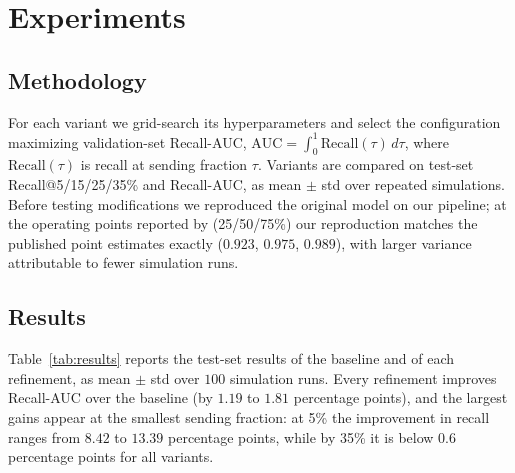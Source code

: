 

\section{Experiments}
\label{sec:experiments}

\subsection{Methodology}
\label{sec:methodology}

For each variant we grid-search its hyperparameters and select the
configuration maximizing validation-set Recall-AUC,
$\mathrm{AUC} = \int_0^1 \mathrm{Recall}(\tau)\,d\tau$, where
$\mathrm{Recall}(\tau)$ is recall at sending fraction $\tau$. Variants are
compared on test-set Recall@5/15/25/35\% and Recall-AUC, as mean $\pm$ std
over repeated simulations. Before testing modifications we reproduced the
original model on our pipeline; at the operating points reported by
\citet{zid2025active} (25/50/75\%) our reproduction matches the published
point estimates exactly ($0.923$, $0.975$, $0.989$), with larger variance
attributable to fewer simulation runs.

\subsection{Results}
\label{sec:results}

Table~\ref{tab:results} reports the test-set results of the baseline and of
each refinement, as mean $\pm$ std over $100$ simulation runs. Every refinement
improves Recall-AUC over the baseline (by $1.19$ to $1.81$ percentage points),
and the largest gains appear at the smallest sending fraction: at 5\% the
improvement in recall ranges from $8.42$ to $13.39$ percentage points, while by
35\% it is below $0.6$ percentage points for all variants.
